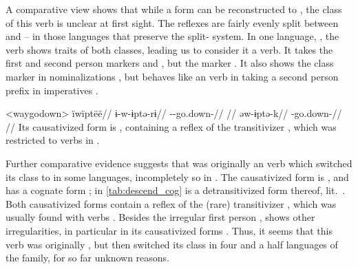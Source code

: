 A comparative view  shows that while a form  can be reconstructed to \PC, the class of this verb is unclear at first sight.
The reflexes are fairly evenly split between  and  -- in those languages that preserve the split- system.
In one language, \wayana, the verb shows traits of both classes, leading us to consider it a  verb.
It takes the first and second person  markers  and  \parencite[200]{wayanatavares2005}, but the  marker  \parencite[206]{wayanatavares2005}.
It also shows the  class marker  in nominalizations , but behaves like an  verb in taking a second person prefix in imperatives .

\pex<waygodown>\wayana \parencite[][200]{wayanatavares2005}
\begingl
\glpreamble ïwïptëë//
\gla ɨ-w-ɨptə-rɨ//
\glb {}--go.down-//
\glft {}//
\endgl
{}
\begingl
\gla əw-ɨptə-k//
\glb {}-go.down-//
\glft {}//
\endgl
\xe
%
Its causativized form is  \parencite[255]{wayanatavares2005}, containing a reflex of the transitivizer , which was restricted to  verbs in \PC \parencite{gildea2019overview}.

Further comparative evidence suggests that   was originally an  verb which switched its class to  in some languages, incompletely so in \wayana.
The \arara causativized form is  \parencite[66]{alves2017arara}, and \kalina has a cognate form  \parencite[263]{courtz2008carib};   in \cref{tab:descend_cog} is a detransitivized form thereof, lit.\ .
Both causativized forms contain a reflex of the (rare) transitivizer , which was usually found with  verbs \parencite{gildea2019overview}.
Besides the irregular first person , \trio {} shows other irregularities, in particular in its causativized forms \parencite[263]{triomeira1999}.
Thus, it seems that this verb was originally , but then switched its class in four and a half languages of the family, for so far unknown reasons.




